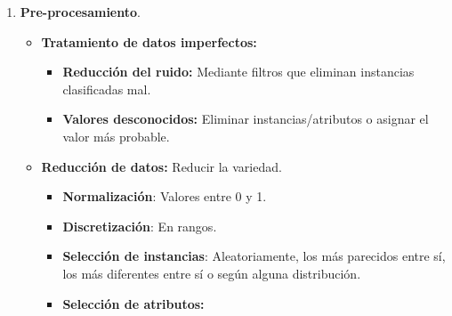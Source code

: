 \documentclass[12pt]{report} %
\begin{document}
\begin{enumerate}
\def\labelenumi{\arabic{enumi}.}
\item
  \textbf{Pre-procesamiento}.

  \begin{itemize}
  \item
    \textbf{Tratamiento de datos imperfectos:}

    \begin{itemize}
    
    \item
      \textbf{Reducción del ruido:} Mediante filtros que eliminan
      instancias clasificadas mal.
    \item
      \textbf{Valores desconocidos:} Eliminar instancias/atributos o
      asignar el valor más probable.
    \end{itemize}
  \item
    \textbf{Reducción de datos:} Reducir la variedad.

    \begin{itemize}
    \item
      \textbf{Normalización}: Valores entre 0 y 1.
    \item
      \textbf{Discretización}: En rangos.
    \item
      \textbf{Selección de instancias}: Aleatoriamente, los más
      parecidos entre sí, los más diferentes entre sí o según alguna
      distribución.
    \item
      \textbf{Selección de atributos:}


\end{itemize}
\end{itemize}
\end{enumerate}
\end{document}
